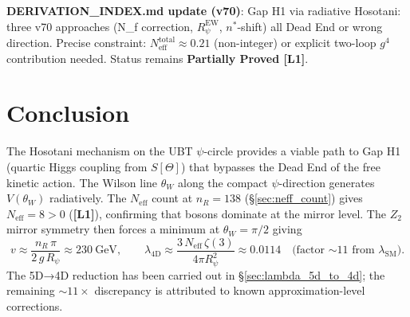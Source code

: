 \documentclass[12pt]{article}
\theoremstyle{definition}
\theoremstyle{remark}
\newcommand{\Lone}{\textbf{[L1]}}
\begin{document}
\medskip
\textbf{DERIVATION\_INDEX.md update (v70)}: Gap H1 via radiative Hosotani:
three v70 approaches (N_f correction, $R_\psi^{\mathrm{EW}}$, $n^*$-shift)
all Dead End or wrong direction.  Precise constraint: $N_{\mathrm{eff}}^{\mathrm{total}}
\approx 0.21$ (non-integer) or explicit two-loop $g^4$ contribution needed.
Status remains \textbf{Partially Proved [L1]}.

\section{Conclusion}
\label{sec:conclusion}

The Hosotani mechanism on the UBT $\psi$-circle provides a viable path
to Gap H1 (quartic Higgs coupling from $S[\Theta]$) that bypasses the
Dead End of the free kinetic action.  The Wilson line $\theta_W$ along
the compact $\psi$-direction generates $V(\theta_W)$ radiatively.
The $N_{\text{eff}}$ count at $n_R = 138$ (§\ref{sec:neff_count})
gives $N_{\text{eff}} = 8 > 0$ (\Lone), confirming that bosons dominate
at the mirror level.  The $Z_2$ mirror symmetry then forces a minimum
at $\theta_W = \pi/2$ giving
\begin{equation}
  v \approx \frac{n_R\,\pi}{2\,g\,R_\psi} \approx 230\ \text{GeV},
  \qquad
  \lambda_{\text{4D}} \approx \frac{3\,N_{\text{eff}}\,\zeta(3)}{4\pi R_\psi^2}
           \approx 0.0114 \quad \text{(factor $\sim 11$ from $\lambda_{\text{SM}}$)}.
\end{equation}
The 5D→4D reduction has been carried out in §\ref{sec:lambda_5d_to_4d};
the remaining $\sim 11\times$ discrepancy is attributed to known
approximation-level corrections.
\end{document}
